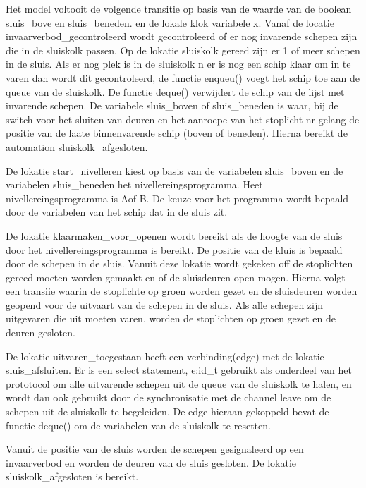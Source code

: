 \begin{thebibliography}{99}
{{{{{{Het model voltooit de volgende transitie op basis van de waarde van de boolean sluis_bove en sluis_beneden. en de lokale klok variabele x.
Vanaf de locatie invaarverbod_gecontroleerd  wordt gecontroleerd of er nog invarende schepen zijn die in de sluiskolk passen.
Op de lokatie sluiskolk gereed zijn er 1 of meer schepen in de sluis. Als er nog plek is in de sluiskolk n er is nog een schip klaar om in te varen dan wordt dit gecontroleerd, de functie enqueu() voegt het schip toe aan de queue van de sluiskolk. De functie deque() verwijdert de schip van de lijst met invarende schepen. De variabele sluis_boven of sluis_beneden is waar, bij de switch voor het sluiten van deuren en het aanroepe van het stoplicht nr gelang de positie van  de laate binnenvarende schip (boven of beneden). Hierna bereikt de automation sluiskolk_afgesloten.



De lokatie start_nivelleren kiest op basis van de variabelen sluis_boven en de variabelen sluis_beneden het nivellereingsprogramma.
Heet nivellereingsprogramma is Aof B. De keuze voor het programma wordt bepaald door de variabelen van het schip dat in de sluis zit.

De lokatie klaarmaken_voor_openen wordt bereikt als de   hoogte van de sluis  door het nivellereingsprogramma is bereikt.
De positie van de kluis is bepaald door de schepen in de sluis. Vanuit deze lokatie wordt gekeken off de stoplichten gereed moeten worden gemaakt en of de sluisdeuren open mogen.
Hierna volgt een transiie waarin de stoplichte op groen worden gezet en de sluisdeuren worden geopend voor de uitvaart van de schepen in de sluis.
Als alle schepen zijn uitgevaren die uit moeten varen, worden de stoplichten op groen gezet en de deuren gesloten.


De lokatie uitvaren_toegestaan heeft een verbinding(edge) met de lokatie sluis_afsluiten.
Er is een select statement, e:id_t gebruikt als onderdeel van het prototocol om alle uitvarende schepen uit de queue van de sluiskolk te halen, en wordt dan ook gebruikt door de synchronisatie met de channel leave om de schepen uit de sluiskolk te begeleiden. De edge hieraan gekoppeld bevat de functie deque() om de variabelen  van de sluiskolk te resetten.

Vanuit de positie van de sluis worden de schepen gesignaleerd op een invaarverbod en worden de deuren van de sluis gesloten.
De lokatie sluiskolk_afgesloten is bereikt.

}}}}}}
\end{thebibliography}
